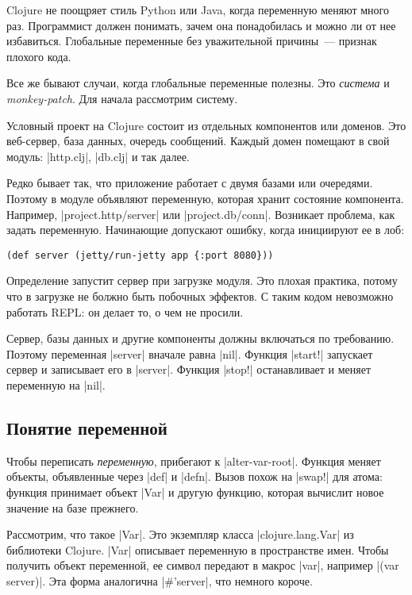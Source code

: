 Clojure не поощряет стиль Python или Java, когда переменную меняют много
раз. Программист должен понимать, зачем она понадобилась и можно ли от нее
избавиться. Глобальные переменные без уважительной причины~--- признак плохого
кода.

Все же бывают случаи, когда глобальные переменные полезны. Это \emph{система} и
\emph{monkey-patch}. Для начала рассмотрим систему.

Условный проект на Clojure состоит из отдельных компонентов или доменов. Это
веб-сервер, база данных, очередь сообщений. Каждый домен помещают в свой модуль:
\spverb|http.clj|, \spverb|db.clj| и так далее.

Редко бывает так, что приложение работает с двумя базами или очередями. Поэтому
в модуле объявляют переменную, которая хранит состояние компонента. Например,
\spverb|project.http/server| или \spverb|project.db/conn|. Возникает проблема,
как задать переменную. Начинающие допускают ошибку, когда инициируют ее в лоб:

\begin{verbatim}
(def server (jetty/run-jetty app {:port 8080}))
\end{verbatim}

Определение запустит сервер при загрузке модуля. Это плохая практика, потому что
в загрузке не болжно быть побочных эффектов. С таким кодом невозможно работать
REPL: он делает то, о чем не просили.

Сервер, базы данных и другие компоненты должны включаться по требованию. Поэтому
переменная \spverb|server| вначале равна \spverb|nil|. Функция \spverb|start!|
запускает сервер и записывает его в \spverb|server|. Функция \spverb|stop!|
останавливает и меняет переменную на \spverb|nil|.

\subsection{Понятие переменной}

Чтобы переписать \emph{переменную}, прибегают к \spverb|alter-var-root|. Функция
меняет объекты, объявленные через \spverb|def| и \spverb|defn|. Вызов похож на
\spverb|swap!| для атома: функция принимает объект \spverb|Var| и другую
функцию, которая вычислит новое значение на базе прежнего.

Рассмотрим, что такое \spverb|Var|. Это экземпляр класса
\spverb|clojure.lang.Var| из библиотеки Clojure. \spverb|Var| описывает
переменную в пространстве имен. Чтобы получить объект переменной, ее символ
передают в макрос \spverb|var|, например \spverb|(var server)|. Эта форма
аналогична \spverb|#'server|, что немного короче.


